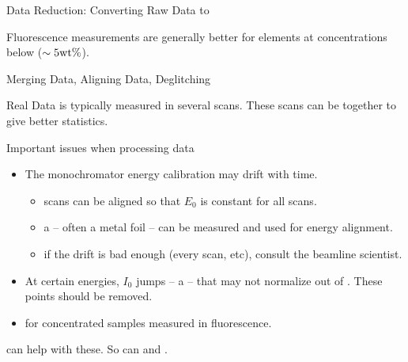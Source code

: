 \begin{slide}{Data Reduction: Converting Raw Data to  {\mue}  }
\begin{cenpage}{145mm}
{{ \vmm


 Fluorescence measurements are generally better for
 elements at concentrations below  ($\sim 5 {\rm wt  \%}$).

}}

  \vfill

\end{cenpage}
\end{slide}

\begin{slide}{Merging Data, Aligning Data, Deglitching }

Real Data is typically measured in several scans.  These scans can be
{} together to give better statistics.

\vmm
Important issues when processing data

\begin{cenpage}{120mm}
\begin{itemize}
\item The monochromator energy calibration may drift with time.
  \begin{itemize}
    \item scans can be aligned so that $E_0$ is constant for all scans.
    \item a {} -- often a metal foil -- can be
      measured {} and used for energy alignment.
    \item if the drift is bad enough (every scan, etc), consult the
      beamline scientist.
  \end{itemize}
\item At certain energies, $I_0$ jumps -- a {} -- that may
  not normalize out of {\mue}.  These points should be removed.
\item {} for concentrated samples measured in
  fluorescence.
  \end{itemize}
\end{cenpage}

{\xasviewer}  can help with these. So can {\athena} and {\sixpack}.



\end{slide}


